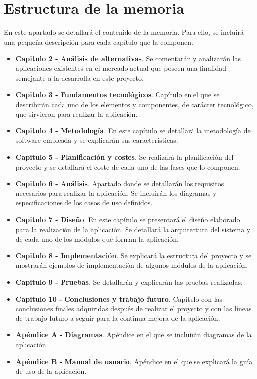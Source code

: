 \section{Estructura de la memoria}
En este apartado se detallará el contenido de la memoria. Para ello, se incluirá una pequeña descripción para cada capítulo que la componen.

\begin{itemize}
	\item \textbf{Capitulo 2 - Análisis de alternativas}. Se comentarán y analizarán las aplicaciones existentes en el mercado actual que poseen una finalidad semejante a la desarrolla en este proyecto.  
	\item \textbf{Capitulo 3 - Fundamentos tecnológicos}. Capítulo en el que se describirán cada uno de los elementos y componentes, de carácter tecnológico, que sirvieron para realizar la aplicación.
	\item \textbf{Capitulo 4 - Metodología}. En este capítulo se detallará la metodología de software empleada y se explicarán sus características.
	\item \textbf{Capitulo 5 - Planificación y costes}. Se realizará la planificación del proyecto y se detallará el coste de cada uno de las fases que lo componen.
	\item \textbf{Capitulo 6 - Análisis}. Apartado donde se detallarán los requisitos necesarios para realizar la aplicación. Se incluirán los diagramas y especificaciones de los casos de uso definidos.
	\item \textbf{Capitulo 7 - Diseño}. En este capítulo se presentará el diseño elaborado para la realización de la aplicación. Se detallará la arquitectura del sistema y de cada uno de los módulos que forman la aplicación.
	\item \textbf{Capitulo 8 - Implementación}. Se explicará la estructura del proyecto y se mostrarán ejemplos de implementación de algunos módulos de la aplicación.
	\item \textbf{Capitulo 9 - Pruebas}. Se detallarán y explicarán las pruebas realizadas.
	\item \textbf{Capitulo 10 - Conclusiones y trabajo futuro}. Capítulo con las conclusiones finales adquiridas después de realizar el proyecto y con las líneas de trabajo futuro a seguir para la continua mejora de la aplicación.
	\item \textbf{Apéndice A - Diagramas}. Apéndice en el que se incluirán diagramas de la aplicación.
	\item \textbf{Apéndice B - Manual de usuario}. Apéndice en el que se explicará la guía de uso de la aplicación.
\end{itemize}

















